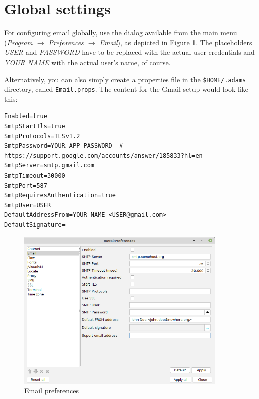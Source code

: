 \documentclass[a4paper]{book}
\begin{document}
\section{Global settings}
For configuring email globally, use the dialog available from the main
menu (\textit{Program $\rightarrow$ Preferences $\rightarrow$ Email}), as depicted in Figure
\ref{email_setup}. The placeholders \textit{USER} and \textit{PASSWORD} have to
be replaced with the actual user credentials and \textit{YOUR NAME} with the
actual user's name, of course.

Alternatively, you can also simply create a properties file in the
\texttt{\$HOME/.adams} directory, called \texttt{Email.props}. The content for
the Gmail setup would look like this:

\begin{verbatim}
Enabled=true
SmtpStartTls=true
SmtpProtocols=TLSv1.2
SmtpPassword=YOUR_APP_PASSWORD  # https://support.google.com/accounts/answer/185833?hl=en
SmtpServer=smtp.gmail.com
SmtpTimeout=30000
SmtpPort=587
SmtpRequiresAuthentication=true
SmtpUser=USER
DefaultAddressFrom=YOUR NAME <USER@gmail.com>
DefaultSignature=
\end{verbatim}

\begin{figure}[htb]
  \centering
  \includegraphics[width=10.0cm]{images/email_setup.png}
  \caption{Email preferences}
  \label{email_setup}
\end{figure}
\end{document}
